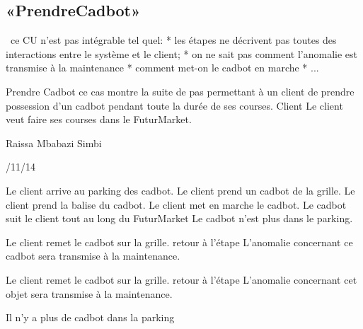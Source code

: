 \subsection{«PrendreCadbot»}
\TODO\ ce CU n'est pas intégrable tel quel: 
* les étapes ne décrivent pas toutes des interactions entre le système et le client; 
* on ne sait pas comment l'anomalie est transmise à la maintenance 
* comment met-on le cadbot en marche
* ...

\startCU
\nom Prendre Cadbot
\but  ce cas montre la suite de pas permettant à un client de prendre possession d'un cadbot pendant toute la durée de ses courses.
\acteur Client
\precondition Le client veut faire ses courses dans le FuturMarket.

\auteur Raissa Mbabazi Simbi
\date 7/11/14

\nominal %
\startnominal
\etape[PC:SA1] Le client arrive au parking des cadbot. 
\etape[PC:RETOUR] 	Le client prend un cadbot de la grille.
\etape[PC:SE1] Le client prend la balise du cadbot.
\etape Le client met en marche le cadbot.
\etape Le cadbot suit le client tout au long du FuturMarket
\stopnominal
\postcondition Le cadbot n'est plus dans le parking.

\alternatifs
\startalternatif[PC:SA1] %
  \etape Le client remet le cadbot sur la grille.
  \etape retour à l'étape \in[PC:RETOUR]
\stopcondition
\postcondition L'anomalie concernant ce cadbot sera transmise à la maintenance.
\stopalternatif

\startalternatif[PC:SE1]
   \etape  Le client remet le cadbot sur la grille.
  \etape retour à l'étape \in[PC:RETOUR]
\stopcondition
\postcondition L'anomalie concernant cet objet sera transmise à la maintenance.
\stopalternatif


\exception
Il n'y a plus de cadbot dans la parking
\stopCU
